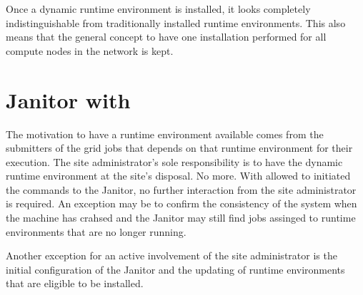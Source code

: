 Once a dynamic runtime environment is installed, it looks completely
indistinguishable from traditionally installed runtime environments. This
also means that the general concept to have one installation performed
for all compute nodes in the network is kept.

% 
% 



% 
% 

\section{Janitor with \AREX}

The motivation to have a runtime environment available comes from the submitters
of the grid jobs that depends on that runtime environment for their execution.
The site administrator's sole responsibility is to have the dynamic runtime
environment at the site's disposal. No more. With \AREX allowed to initiated
the commands to the Janitor, no further interaction from the site administrator
is required. An exception may be to confirm the consistency of the system when
the machine has crahsed and the Janitor may still find jobs assinged to runtime
environments that are no longer running.

Another exception for an active involvement of the site administrator is the
initial configuration of the Janitor and the updating of runtime environments
that are eligible to be installed.

